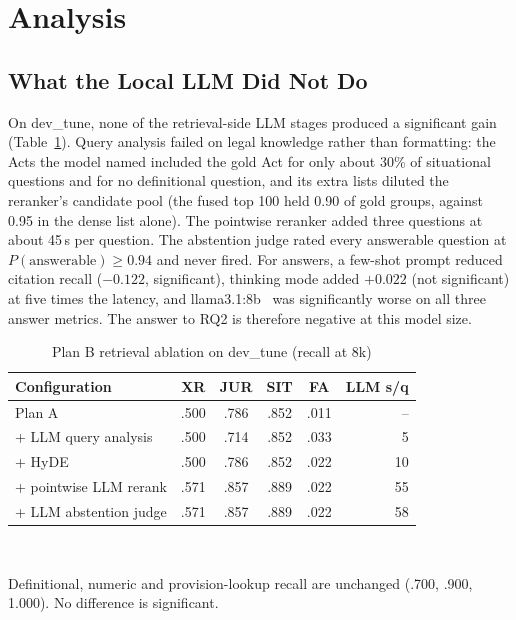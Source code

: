 \documentclass[conference]{IEEEtran}
\begin{document}
\section{Analysis}

\subsection{What the Local LLM Did Not Do}

On dev\_tune, none of the retrieval-side LLM stages produced a significant gain (Table~\ref{tab:planb}). Query
analysis failed on legal knowledge rather than formatting: the Acts the model named included the gold Act for only
about 30\% of situational questions and for no definitional question, and its extra lists diluted the reranker's
candidate pool (the fused top 100 held 0.90 of gold groups, against 0.95 in the dense list alone). The pointwise reranker added three questions at
about 45\,s per question. The abstention judge rated every answerable question at $P(\text{answerable})\ge0.94$
and never fired. For answers, a few-shot prompt reduced citation recall ($-0.122$, significant), thinking mode
added $+0.022$ (not significant) at five times the latency, and llama3.1:8b~\cite{dubey2024llama3} was
significantly worse on all three answer metrics. The answer to RQ2 is therefore negative at this model size.

\begin{table}[t]
\caption{Plan B retrieval ablation on dev\_tune (recall at 8k)}
\label{tab:planb}
\centering
\footnotesize
\setlength{\tabcolsep}{3.5pt}
\begin{tabular}{@{}lccccr@{}}
\toprule
Configuration & XR & JUR & SIT & FA & LLM s/q \\
\midrule
Plan A & .500 & .786 & .852 & .011 & -- \\
+ LLM query analysis & .500 & .714 & .852 & .033 & 5 \\
+ HyDE & .500 & .786 & .852 & .022 & 10 \\
+ pointwise LLM rerank & .571 & .857 & .889 & .022 & 55 \\
+ LLM abstention judge & .571 & .857 & .889 & .022 & 58 \\
\bottomrule
\end{tabular}
\\[2pt]
\raggedright\scriptsize Definitional, numeric and provision-lookup recall are unchanged (.700, .900, 1.000). No
difference is significant.
\end{table}
\end{document}
